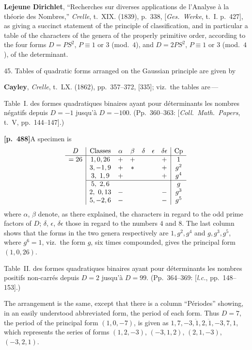 \documentclass[11pt,a4paper]{article}
\begin{document}
\textbf{Lejeune Dirichlet}, ``Recherches sur diverses applications de l'Analyse \`a la th\'eorie des Nombres,'' \textit{Crelle}, t.~XIX. (1839), p.~338, [\textit{Ges.\ Werke}, t.~I. p.~427], as giving a succinct statement of the principle of classification, and in particular a table of the characters of the genera of the properly primitive order, according to the four forms $D = PS^{2}$, $P \equiv 1$ or $3$ (mod.~$4$), and $D = 2PS^{2}$, $P \equiv 1$ or $3$ (mod.~$4$), of the determinant.

45. Tables of quadratic forms arranged on the Gaussian principle are given by

\textbf{Cayley}, \textit{Crelle}, t.~LX. (1862), pp.~357--372, [335]; viz.\ the tables are\,---

Table~I. des formes quadratiques binaires ayant pour d\'eterminants les nombres n\'egatifs depuis $D = -1$ jusqu'\`a $D = -100$. (Pp.~360--363: [\textit{Coll.\ Math.\ Papers}, t.~V, pp.~144--147].)

\noindent\textbf{[p.~488]}\quad A specimen is
\[
\begin{array}{c|cccccc|c}
D & \text{Classes} & \alpha & \beta & \delta & \epsilon & \delta\epsilon & \text{Cp} \\
\hline
= 26 & 1, 0, 26 & + & + & & & + & 1 \\
 & 3, -1, 9 & + & * & & & + & g^{2} \\
 & 3,\ 1, 9 & + & & & & + & g^{4} \\
\cline{2-8}
 & 5,\ 2, 6 &   &   & & & & g \\
 & 2,\ 0, 13 & - &   & & & - & g^{3} \\
 & 5, -2, 6 & - &   & & & - & g^{5}
\end{array}
\]
where $\alpha$, $\beta$ denote, as there explained, the characters in regard to the odd prime factors of $D$; $\delta$, $\epsilon$, $\delta\epsilon$ those in regard to the numbers $4$ and $8$. The last column shows that the forms in the two genera respectively are $1, g^{2}, g^{4}$ and $g, g^{3}, g^{5}$, where $g^{6} = 1$, viz.\ the form $g$, six times compounded, gives the principal form $(1, 0, 26)$.

Table~II. des formes quadratiques binaires ayant pour d\'eterminants les nombres positifs non-carr\'es depuis $D = 2$ jusqu'\`a $D = 99$. (Pp.~364--369: [\textit{l.c.}, pp.~148--153].)

The arrangement is the same, except that there is a column ``P\'eriodes'' showing, in an easily understood abbreviated form, the period of each form. Thus $D = 7$, the period of the principal form $(1, 0, -7)$, is given as $1, 7, -3, \ddot{1}, 2, \ddot{1}, -3, 7, 1$, which represents the series of forms $(1, 2, -3)$, $(-3, 1, 2)$, $(2, 1, -3)$, $(-3, 2, 1)$.
\end{document}
